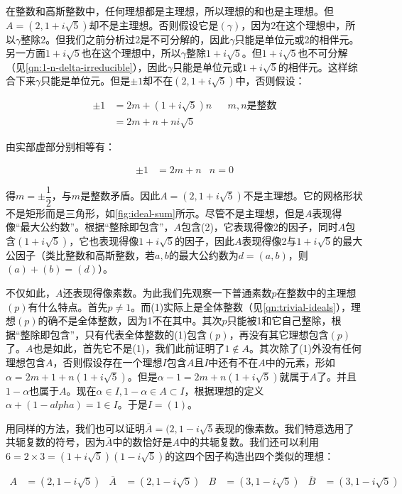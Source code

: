 \documentclass[b5paper]{ctexart}
\begin{document}
在整数和高斯整数中，任何理想都是主理想，所以理想的和也是主理想。但$A = (2, 1 + i\sqrt{5})$却不是主理想。否则假设它是$(\gamma)$，因为2在这个理想中，所以$\gamma$整除2。但我们之前分析过2是不可分解的，因此$\gamma$只能是单位元或2的相伴元。另一方面$1 + i\sqrt{5}$也在这个理想中，所以$\gamma$整除$1 + i\sqrt{5}$。但$1 + i\sqrt{5}$也不可分解（见\cref{qn:1-n-delta-irreducible}），因此$\gamma$只能是单位元或$1 + i\sqrt{5}$的相伴元。这样综合下来$\gamma$只能是单位元。但是$\pm 1$却不在$(2, 1 + i\sqrt{5})$中，否则假设：

\begin{align*}
\pm 1 &= 2m + (1 + i\sqrt{5})n &&m, n\text{是整数} \\
  &= 2m + n + ni\sqrt{5}
\end{align*}

由实部虚部分别相等有：

\begin{align*}
\pm 1 &= 2m + n & n = 0
\end{align*}

得$m = \pm\dfrac{1}{2}$，与$m$是整数矛盾。因此$A = (2, 1 + i\sqrt{5})$不是主理想。它的网格形状不是矩形而是三角形，如\cref{fig:ideal-sum}所示。尽管不是主理想，但是$A$表现得像“最大公约数”。根据“整除即包含”，$A$包含(2)，它表现得像2的因子，同时$A$包含$(1 + i\sqrt{5})$，它也表现得像$1 + i\sqrt{5}$的因子，因此$A$表现得像2与$1 + i\sqrt{5}$的最大公因子（类比整数和高斯整数，若$a, b$的最大公约数为$d = (a, b)$，则$(a) + (b) = (d)$）。

不仅如此，$A$还表现得像素数。为此我们先观察一下普通素数$p$在整数中的主理想$(p)$有什么特点。首先$p \ne 1$。而(1)实际上是全体整数（见\cref{qn:trivial-ideals}），理想$(p)$的确不是全体整数，因为1不在其中。其次$p$只能被1和它自己整除，根据“整除即包含”，只有代表全体整数的(1)包含$(p)$，再没有其它理想包含$(p)$了。$A$也是如此，首先它不是(1)，我们此前证明了$1 \notin A$。其次除了(1)外没有任何理想包含$A$，否则假设存在一个理想$I$包含$A$且$I$中还有不在$A$中的元素，形如$\alpha = 2m + 1 + n(1 + i\sqrt{5})$。但是$\alpha - 1 = 2m + n(1 + i\sqrt{5})$就属于$A$了。并且$1 - \alpha$也属于$A$。现在$\alpha \in I, 1 - \alpha \in A \subset I$，根据理想的定义$\alpha + (1 - alpha) = 1 \in I$。于是$I = (1)$。

用同样的方法，我们也可以证明$\overline{A} = (2, 1 - i\sqrt{5}$表现的像素数。我们特意选用了共轭复数的符号，因为$\overline{A}$中的数恰好是$A$中的共轭复数。我们还可以利用$6 = 2 \times 3 = (1 + i\sqrt{5})(1 - i\sqrt{5})$的这四个因子构造出四个类似的理想：

\begin{align*}
A &= (2, 1 - i\sqrt{5})  & \overline{A} &= (2, 1 - i\sqrt{5}) &
B &= (3, 1 - i\sqrt{5})  & \overline{B} &= (3, 1 - i\sqrt{5})
\end{align*}
\end{document}
